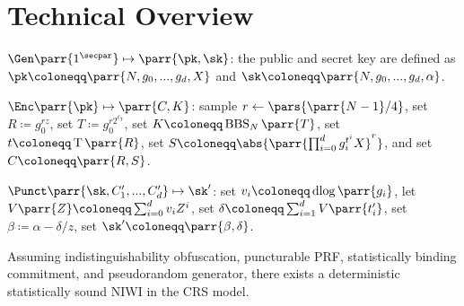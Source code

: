 \section{Technical Overview}
\label{sec:overview}

\begin{sitemize}
    \item \(\Gen\parr{1^\secpar} \mapsto \parr{\pk,\sk}\):
    the public and secret key are defined as \(\pk \coloneqq \parr{N, g_0, ..., g_d, X}\) and \(\sk \coloneqq \parr{N, g_0, ..., g_d, \alpha}\).
    
    \item \(\Enc\parr{\pk} \mapsto \parr{C,K}\):
    sample \(r \gets \pars{\parr{N-1}/4}\),
    set \(R \coloneqq g_0^{r z}\),
    set \(T \coloneqq g_0^{r 2^{\ell_{\mathsf{T}}}}\),
    set \(K \coloneqq \operatorname{BBS}_N\parr{T}\),
    set \(t \coloneqq \operatorname{T}\parr{R}\),
    set \(S \coloneqq \abs{\parr{\prod_{i=0}^d g_i^{t^i} X}^r}\),
    and set \(C \coloneqq \parr{R,S}\).
    \item \(\Punct\parr{\sk,C'_1,...,C'_d} \mapsto \sk'\):
    set \(v_i \coloneqq \operatorname{dlog}\parr{g_i}\),
    let \(V\parr{Z} \coloneqq \sum_{i=0}^d v_i Z^i\),
    set \(\delta \coloneqq \sum_{i=1}^d V\parr{t'_i}\),
    set \(\beta \coloneqq \alpha - \delta/z\),
    set \(\sk' \coloneqq \parr{\beta, \delta}\).
\end{sitemize}

\begin{theorem}
    Assuming indistinguishability obfuscation,
    puncturable PRF,
    statistically binding commitment,
    and pseudorandom generator,
    there exists a deterministic statistically sound NIWI in the CRS model.
\end{theorem}

